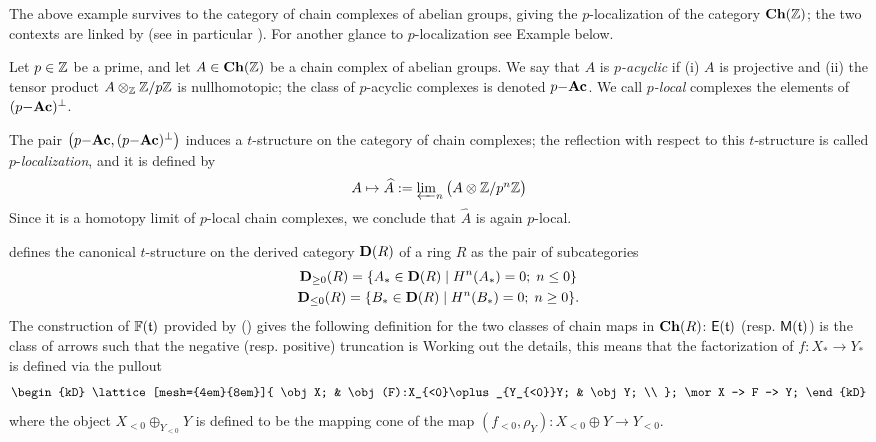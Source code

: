 The above example survives to the category of chain complexes of abelian groups, giving the $p$\hyp{}localization of the category $\mathbf{Ch}(\mathbb{Z})$; the two contexts are linked by \cite[\S\textbf{2}]{bousfield1979localization} (see in particular \cite[\textbf{2.4}, \textbf{2.5}]{bousfield1979localization}). For another glance to $p$\hyp{}localization see Example  below.
\begin{example}
Let $p \in \mathbb{Z}$ be a prime, and let $A\in\mathbf{Ch}(\mathbb{Z})$ be a chain complex of abelian groups. We say that $A$ is \emph{$p$\hyp{}acyclic} if (i) $A$ is projective and (ii) the tensor product $A \otimes_{\mathbb{Z}} \mathbb{Z} /p\mathbb{Z}$ is nullhomotopic; the class of $p$\hyp{}acyclic complexes is denoted $p\mathbf{-Ac}$. We call \emph{$p$\hyp{}local} complexes the elements of $(p\mathbf{-Ac})^\perp$.

The pair $\big(p\mathbf{-Ac}, (p\mathbf{-Ac})^\perp\big)$ induces a $t$\hyp{}structure on the category of chain complexes; the reflection with respect to this $t$\hyp{}structure is called $p$\hyp{}\emph{localization}, and it is defined by
\[\textstyle
A\mapsto \widehat{A}:= \varprojlim_n \big(A\otimes \mathbb{Z}/p^n\mathbb{Z}\big)
\]
Since it is a homotopy limit of $p$\hyp{}local chain complexes, we conclude that $\widehat{A}$ is again $p$\hyp{}local.
\end{example}
\begin{example}
 defines the canonical $t$\hyp{}structure on the derived category $\mathbf{D}(R)$ of a ring $R$ as the pair of subcategories
\begin{gather*}
\mathbf{D}_{\ge 0}(R) = \{  A_* \in \mathbf{D}(R) \mid H^n(A_*)=0;\; n\le 0 \}\\
\mathbf{D}_{\le 0}(R) = \{ B_* \in \mathbf{D}(R) \mid H^n(B_*)=0;\; n\ge 0 \}.
\end{gather*}
The construction of $\mathbb{F}(\mathfrak{t})$ provided by () gives the following definition for the two classes of chain maps in $\mathbf{Ch}(R)$: $\mathsf{E}(\mathfrak{t})$ (resp. $\mathsf{M}(\mathfrak{t})$) is the class of arrows such that the negative (resp. positive) truncation is Working out the details, this means that the factorization of $f\colon X_*\to Y_*$ is defined via the pullout
\[
\begin{kD}
\lattice[mesh={4em}{8em}]{
	\obj X; & \obj (F):X_{<0}\oplus_{Y_{<0}}Y; & \obj Y; \\
};
\mor X -> F -> Y;
\end{kD}
\]
where the object $X_{<0}\oplus_{Y_{<0}}Y$ is defined to be the mapping cone of the map $(f_{<0}, \rho_Y)\colon X_{<0}\oplus Y\to Y_{<0}$.
\end{example}

